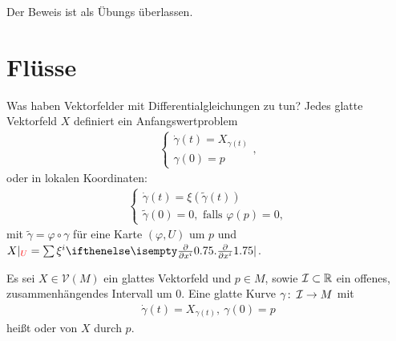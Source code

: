 Der Beweis ist als Übungs überlassen.


\section{Flüsse}

Was haben Vektorfelder mit Differentialgleichungen zu tun? Jedes glatte Vektorfeld $X$ definiert ein Anfangswertproblem
\begin{align*}
  \begin{cases}
    \dot \gamma(t) = X_{\gamma(t)}\\
    \gamma(0) = p
  \end{cases},
\end{align*}
oder in lokalen Koordinaten:
\begin{align*}
  \begin{cases}
    \dot \gamma(t) = \xi(\tilde \gamma(t))\\
    \tilde \gamma(0) = 0, \text{ falls } \varphi(p) = 0,
  \end{cases}
\end{align*}
mit $\tilde \gamma = \varphi \circ \gamma$ für eine Karte $(\varphi,U)$ um $p$ und $X|_{\textcolor{red}{U}} = \sum \xi^i \pdifffrac{}{x^i}$.

\begin{Dfn}
  Es sei $X \in \mathcal V(M)$ ein glattes Vektorfeld und $p \in M$, sowie $\operatorname{\mathcal{I}} \subset \operatorname{\mathbb{R}}$ ein offenes, zusammenhängendes Intervall um $0$. Eine glatte Kurve $\gamma \colon \operatorname{\mathcal{I}} \to M$ mit
  \begin{align*}
    \dot \gamma(t) = X_{\gamma(t)}, \ \gamma(0) = p
  \end{align*}
  heißt  oder  von $X$ durch $p$.
\end{Dfn}


